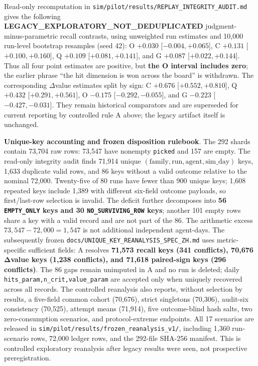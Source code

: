 \documentclass[
  11pt]{article}
\begin{document}
Read-only recomputation in
\texttt{sim/pilot/results/REPLAY\_INTEGRITY\_AUDIT.md} gives the
following \textbf{LEGACY\_EXPLORATORY\_NOT\_DEDUPLICATED}
judgment-minus-parametric recall contrasts, using unweighted run
estimates and 10,000 run-level bootstrap resamples (seed 42): O
\(+0.030\) {[}\(-0.004,+0.065\){]}, C \(+0.131\)
{[}\(+0.100,+0.160\){]}, Q \(+0.109\) {[}\(+0.081,+0.141\){]}, and G
\(+0.087\) {[}\(+0.022,+0.144\){]}. Thus all four point estimates are
positive, but \textbf{the O interval includes zero}; the earlier phrase
``the hit dimension is won across the board'' is withdrawn. The
corresponding \(\Delta\)value estimates split by sign: C \(+0.676\)
{[}\(+0.552,+0.810\){]}, Q \(+0.432\) {[}\(+0.291,+0.561\){]}, O
\(-0.175\) {[}\(-0.292,-0.055\){]}, and G \(-0.223\)
{[}\(-0.427,-0.031\){]}. They remain historical comparators and are
superseded for current reporting by controlled rule A above; the legacy
artifact itself is unchanged.

\textbf{Unique-key accounting and frozen disposition rulebook}. The 292
shards contain 73,704 raw rows: 73,547 have nonempty \texttt{picked} and
157 are empty. The read-only integrity audit finds 71,914 unique
\((\mathrm{family},\mathrm{run},\mathrm{agent},\mathrm{sim\_day})\)
keys, 1,633 duplicate valid rows, and 86 keys without a valid outcome
relative to the nominal 72,000. Twenty-five of 80 runs have fewer than
900 unique keys; 1,608 repeated keys include 1,389 with different
six-field outcome payloads, so first/last-row selection is invalid. The
deficit further decomposes into \textbf{56 \texttt{EMPTY\_ONLY} keys and
30 \texttt{NO\_SURVIVING\_ROW} keys}; another 101 empty rows share a key
with a valid record and are not part of the 86. The arithmetic excess
\(73{,}547-72{,}000=1{,}547\) is not additional independent agent-days.
The subsequently frozen
\texttt{docs/UNIQUE\_KEY\_REANALYSIS\_SPEC\_ZH.md} uses metric-specific
sufficient fields: A resolves \textbf{71,573 recall keys (341
conflicts), 70,676 Δvalue keys (1,238 conflicts), and 71,618 paired-sign
keys (296 conflicts)}. The 86 gaps remain unimputed in A and no run is
deleted; daily \texttt{hits\_param,n\_crit,value\_param} are accepted
only when uniquely recovered across all records. The controlled
reanalysis also reports, without selection by results, a five-field
common cohort (70,676), strict singletons (70,306), audit-six
consistency (70,525), attempt means (71,914), five outcome-blind hash
salts, two zero-consumption scenarios, and protocol-extreme endpoints.
All 17 scenarios are released in
\texttt{sim/pilot/results/frozen\_reanalysis\_v1/}, including 1,360
run-scenario rows, 72,000 ledger rows, and the 292-file SHA-256
manifest. This is controlled exploratory reanalysis after legacy results
were seen, not prospective preregistration.
\end{document}
